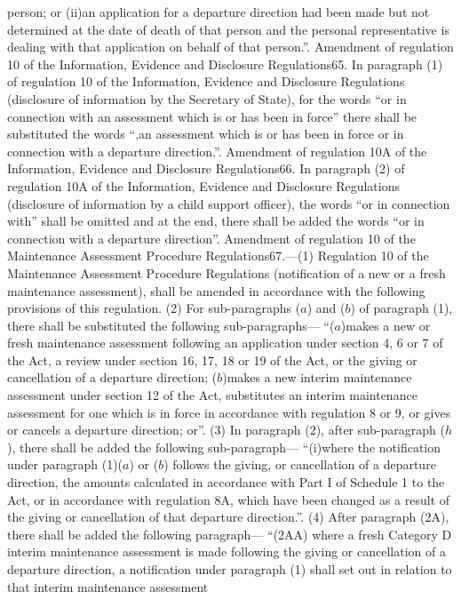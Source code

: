 \documentclass[a4paper]{article}
\begin{document}
person; or
(ii)an application for a departure direction had been made but not determined at
the date of death of that person and the personal representative is dealing with
that application on behalf of that person.”.
Amendment of regulation 10 of the Information, Evidence and Disclosure
Regulations65. In paragraph (1) of regulation 10 of the Information, Evidence
and Disclosure Regulations (disclosure of information by the Secretary of
State), for the words “or in connection with an assessment which is or has been
in force” there shall be substituted the words “,an assessment which is or has
been in force or in connection with a departure direction.”.
Amendment of regulation 10A of the Information, Evidence and Disclosure
Regulations66. In paragraph (2) of regulation 10A of the Information, Evidence
and Disclosure Regulations (disclosure of information by a child support
officer), the words “or in connection with” shall be omitted and at the end,
there shall be added the words “or in connection with a departure direction”.
Amendment of regulation 10 of the Maintenance Assessment Procedure
Regulations67.—(1) Regulation 10 of the Maintenance Assessment Procedure
Regulations (notification of a new or a fresh maintenance assessment), shall be
amended in accordance with the following provisions of this regulation.
(2) For sub-paragraphs ($a$) and ($b$) of paragraph (1), there shall be substituted
the following sub-paragraphs—
“($a$)makes a new or fresh maintenance assessment following an application under
section 4, 6 or 7 of the Act, a review under section 16, 17, 18 or 19 of the
Act, or the giving or cancellation of a departure direction;
($b$)makes a new interim maintenance assessment under section 12 of the Act,
substitutes an interim maintenance assessment for one which is in force in
accordance with regulation 8 or 9, or gives or cancels a departure direction;
or”.
(3) In paragraph (2), after sub-paragraph ($h$), there shall be added the
following sub-paragraph—
“(i)where the notification under paragraph (1)($a$) or ($b$) follows the giving, or
cancellation of a departure direction, the amounts calculated in accordance with
Part I of Schedule 1 to the Act, or in accordance with regulation 8A, which have
been changed as a result of the giving or cancellation of that departure
direction.”.
(4) After paragraph (2A), there shall be added the following paragraph—
“(2AA) where a fresh Category D interim maintenance assessment is made following
the giving or cancellation of a departure direction, a notification under
paragraph (1) shall set out in relation to that interim maintenance assessment
\end{document}
